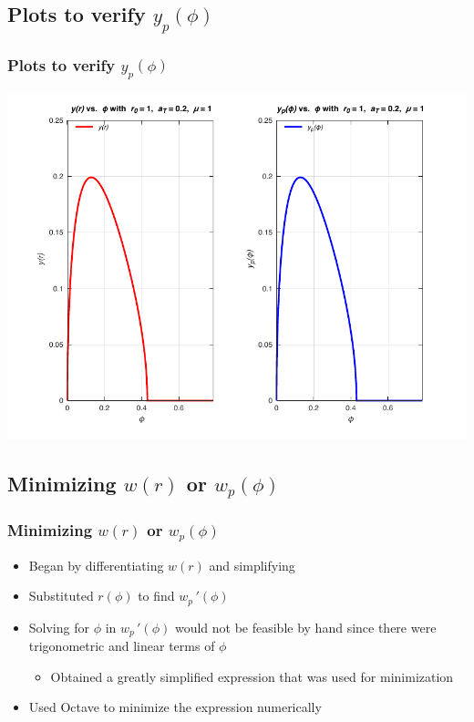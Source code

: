 \documentclass{beamer}
\newcommand{\sectit}[1]{
    \section{\texorpdfstring{#1}{}}
    \frametitle{#1}
}
\begin{document}
\begin{frame}
    \sectit{Plots to verify $y_p(\phi)$}

    \begin{center}
        \includegraphics[scale=0.7]{plots/partB.pdf}
    \end{center}
\end{frame}

\begin{frame}
    \sectit{Minimizing $w(r)$ or $w_p(\phi)$}

    \begin{itemize}
        \item Began by differentiating $w(r)$ and simplifying
        \item Substituted $r(\phi)$ to find $w_p\,'(\phi)$
        \item Solving for $\phi$ in $w_p\,'(\phi)$ would not be feasible by hand since there were trigonometric and linear terms of $\phi$
        \begin{itemize}
            \item Obtained a greatly simplified expression that was used for minimization
        \end{itemize}
        \item Used Octave to minimize the expression numerically
    \end{itemize}

\end{frame}
\end{document}
